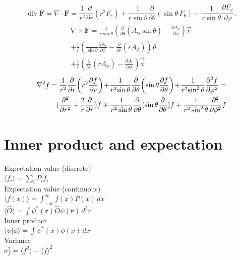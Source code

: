 \documentclass[12pt,a4paper]{article}
\begin{document}
	\begin{equation}
		\operatorname {div} \mathbf {F} =\nabla \cdot \mathbf {F} ={\frac {1}{r^{2}}}{\frac {\partial }{\partial r}}\left(r^{2}F_{r}\right)+{\frac {1}{r\sin \theta }}{\frac {\partial }{\partial \theta }}(\sin \theta \,F_{\theta })+{\frac {1}{r\sin \theta }}{\frac {\partial F_{\varphi }}{\partial \varphi }}.
	\end{equation}
	\begin{equation}
		\begin{aligned}
			\nabla \times \mathbf{F} = \frac{1}{r\sin\theta} (\frac{\partial }{\partial \theta} (A_\phi \sin \theta ) - \frac{\partial A_\theta}{\partial \phi}) \vec{r} \\
			+ \frac{1}{r}(\frac{1}{\sin\theta }\frac{\partial A_r}{\partial \phi} - \frac{\partial}{\partial r }(rA_\phi)) \vec{\theta} \\
			+ \frac{1}{r} (\frac{\partial}{\partial r}(r A_\phi) - \frac{\partial A_r}{\partial \phi}) \vec{\phi}
		\end{aligned}
	\end{equation}
	\begin{equation}
		\begin{aligned}
			\nabla^2 f = {1 \over r^{2}}{\partial  \over \partial r}\!\left(r^{2}{\partial f \over \partial r}\right)\!+\!{1 \over r^{2}\!\sin \theta }{\partial  \over \partial \theta }\!\left(\sin \theta {\partial f \over \partial \theta }\right)\!+\!{1 \over r^{2}\!\sin ^{2}\theta }{\partial ^{2}f \over \partial \varphi ^{2}} = \\ (\frac{\partial^2}{\partial r^2} + \frac{2}{r} \frac{\partial}{\partial r}) f
			+ \frac{1}{r^2 \sin \theta }\frac{\partial}{\partial \theta} (\sin \theta \frac{\partial}{\partial \theta})f
			+ \frac{1}{r^2 \sin ^2 \theta } \frac{\partial ^2}{\partial \phi ^2 } f
		\end{aligned}
	\end{equation}
	
	
	\section*{Inner product and expectation}
	\begin{center}
		Expectation value (discrete) \\[.15in]
		\(\langle f_i \rangle = \sum_{i} P_i f_i\) \\[.25in]
		Expectation value (continuous) \\[.15in]
		\(\langle f(x) \rangle = \int_{-\infty}^{\infty} f(x) P(x) \, dx\) \\[.15in]
		\(\langle \hat{O} \rangle = \int \psi^*(\mathbf{r}) \hat{O} \psi(\mathbf{r}) \, d^3r\) \\[.25in]
		Inner product \\[.15in]
		\(\langle \psi | \phi \rangle = \int \psi^*(x) \phi(x) \, dx\) \\[.25in]
		Variance \\[.15in]
		\(\sigma_f^2 = \langle f^2 \rangle - \langle f \rangle^2\)
	\end{center}	
	
\end{document}
